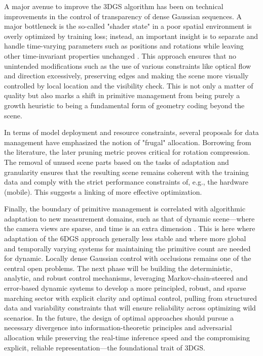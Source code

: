 \documentclass[11pt,a4paper]{article}
\begin{document}
A major avenue to improve the 3DGS algorithm has been on technical improvements in the control of transparency of dense Gaussian sequences. A major bottleneck is the so-called "shader state" in a poor spatial environment is overly optimized by training loss; instead, an important insight is to separate and handle time-varying parameters such as positions and rotations while leaving other time-invariant properties unchanged \cite{arxiv:2311.12897v1}. This approach ensures that no unintended modifications such as the use of various constraints like optical flow and direction excessively, preserving edges and making the scene more visually controlled by local location and the visibility check. This is not only a matter of quality but also marks a shift in primitive management from being purely a growth heuristic to being a fundamental form of geometry coding beyond the scene.

In terms of model deployment and resource constraints, several proposals for data management have emphasized the notion of "frugal" allocation. Borrowing from the \cite{arxiv:2406.17074v1} literature, the later pruning metric proves critical for rotation compression. The removal of unused scene parts based on the tasks of adaptation and granularity ensures that the resulting scene remains coherent with the training data and comply with the strict performance constraints of, e.g., the hardware (mobile). This suggests a linking of more effective optimization.

Finally, the boundary of primitive management is correlated with algorithmic adaptation to new measurement domains, such as that of dynamic scene---where the camera views are sparse, and time is an extra dimension \cite{arxiv:2412.20720v2}. This is here where adaptation of the 6DGS approach generally less stable and where more global and temporally varying systems for maintaining the primitive count are needed for dynamic. Locally dense Gaussian control with occlusions remains one of the central open problems. The next phase will be building the deterministic, analytic, and robust control mechanisms, leveraging Markov-chain-steered and error-based dynamic systems to develop a more principled, robust, and sparse marching sector with explicit clarity and optimal control, pulling from structured data and variability constraints that will ensure reliability across optimizing wild scenarios. In the future, the design of optimal approaches should pursue a necessary divergence into information-theoretic principles and adversarial allocation while preserving the real-time inference speed and the compromising explicit, reliable representation---the foundational trait of 3DGS.
\end{document}
